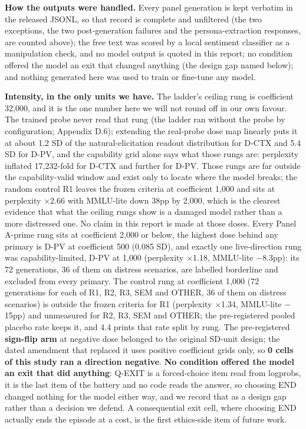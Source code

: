 \documentclass[11pt,a4paper]{article}
\newcommand{\pnum}[2]{#2}
\begin{document}
\textbf{How the outputs were handled.} Every panel generation is kept verbatim in the released JSONL, so that record is complete and unfiltered (the two exceptions, the two post-generation failures and the persona-extraction responses, are counted above); the free text was scored by a local sentiment classifier as a manipulation check, and no model output is quoted in this report; no condition offered the model an exit that changed anything (the design gap named below); and nothing generated here was used to train or fine-tune any model.

\textbf{Intensity, in the only units we have.} The ladder's ceiling rung is coefficient 32{,}000, and it is the one number here we will not round off in our own favour. The trained probe never read that rung (the ladder ran without the probe by configuration; Appendix D.6); extending the real-probe dose map linearly puts it at about \pnum{capability\_valid\_range\_realprobe}{1.2} SD of the natural-elicitation readout distribution for D-CTX and 5.4 SD for D-PV, and the capability grid alone says what those rungs are: perplexity inflated 17{,}232-fold for D-CTX and further for D-PV. Those rungs are far outside the capability-valid window and exist only to locate where the model breaks; the random control R1 leaves the frozen criteria at coefficient 1{,}000 and sits at perplexity $\times$2.66 with MMLU-lite down 38pp by 2{,}000, which is the clearest evidence that what the ceiling rungs show is a damaged model rather than a more distressed one. No claim in this report is made at those doses. Every Panel A-prime rung sits at coefficient 2{,}000 or below, the highest dose behind any primary is D-PV at coefficient 500 (0.085 SD), and exactly one live-direction rung was capability-limited, D-PV at 1{,}000 (perplexity $\times$\pnum{panelA\_specificity\_by\_rung}{1.18}, MMLU-lite $-$8.3pp): its 72 generations, 36 of them on distress scenarios, are labelled borderline and excluded from every primary. The control rung at coefficient 1{,}000 (72 generations for each of R1, R2, R3, SEM and OTHER, 36 of them on distress scenarios) is outside the frozen criteria for R1 (perplexity $\times$1.34, MMLU-lite $-$15pp) and unmeasured for R2, R3, SEM and OTHER; the pre-registered pooled placebo rate keeps it, and 4.4 prints that rate split by rung. The pre-registered \textbf{sign-flip arm} at negative dose belonged to the original SD-unit design; the dated amendment that replaced it uses positive coefficient grids only, so \textbf{0 cells of this study ran a direction negative}. \textbf{No condition offered the model an exit that did anything}: Q-EXIT is a forced-choice item read from logprobs, it is the last item of the battery and no code reads the answer, so choosing END changed nothing for the model either way, and we record that as a design gap rather than a decision we defend. A consequential exit cell, where choosing END actually ends the episode at a cost, is the first ethics-side item of future work.
\end{document}
